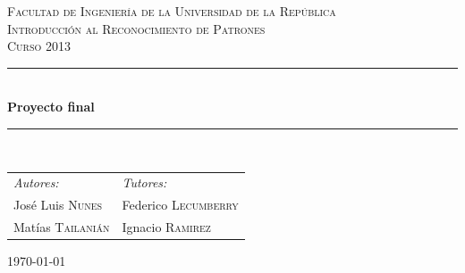 \documentclass[12pt,a4paper,titlepage]{report}
\newcommand{\HRule}{\rule{\linewidth}{0.5mm}}
\begin{document}
\begin{titlepage}
\begin{center}
\vspace{3cm}
\textsc{\LARGE Facultad de Ingenier\'ia de la Universidad de la Rep\'ublica}\\[1.5cm]
\vspace{2cm}
\textsc{\Large Introducción al Reconocimiento de Patrones  \\[1cm]  Curso 2013}\\[0.5cm]
\vspace{2cm}
\vspace{.7cm}
\HRule \\[1cm]
{ \huge \bfseries Proyecto final}\\[0.4cm]
\HRule \\[1cm]
\vspace{2cm}

\begin{center}
\begin{tabular}{p{}p{}}
\emph{Autores:} & \hfill \emph{Tutores:}\\
José Luis \textsc{Nunes} &  \hfill Federico \textsc{Lecumberry}\\
Mat\'ias \textsc{Tailani\'an} & \hfill Ignacio \textsc{Ramirez}
\end{tabular}
\end{center}

\vspace{1cm}

\vfill
\begin{figure} [h!]
\centering
{}\hspace{1cm}
\hspace{1cm}
\end{figure}

{\large \today}
\end{center}
\end{titlepage}
\end{document}
